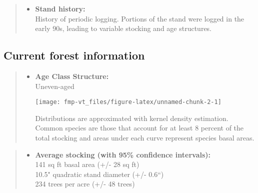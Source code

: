 \documentclass[]{tufte-handout}
\providecommand{\tightlist}{%
  \setlength{\itemsep}{0pt}\setlength{\parskip}{0pt}}
\begin{document}
\begin{quote}
\begin{itemize}
\tightlist
\item
  \textbf{Stand history:}\\
  \vspace{2pt} History of periodic logging. Portions of the stand were
  logged in the early 90s, leading to variable stocking and age
  structures.
\end{itemize}
\end{quote}

\subsection{Current forest
information}\label{current-forest-information}

\begin{quote}
\begin{itemize}
\tightlist
\item
  \textbf{Age Class Structure:}\\
  \vspace{2pt} Uneven-aged\\

  \begin{marginfigure}
  \texttt{[image: fmp-vt\_files/figure-latex/unnamed-chunk-2-1]} \caption[Distributions are approximated with kernel density estimation]{Distributions are approximated with kernel density estimation. Common species are those that account for at least 8 percent of the total stocking and areas under each curve represent species basal areas.}\label{fig:unnamed-chunk-2}
  \end{marginfigure}
\end{itemize}
\end{quote}

\begin{quote}
\begin{itemize}
\tightlist
\item
  \textbf{Average stocking (with 95\% confidence intervals):}\\
  \vspace{2pt} 141 sq ft basal area (+/- 28 sq ft)\\
  10.5" quadratic stand diameter (+/- 0.6``)\\
  234 trees per acre (+/- 48 trees)\\
  \vspace{8pt}
\end{itemize}
\end{quote}
\end{document}
